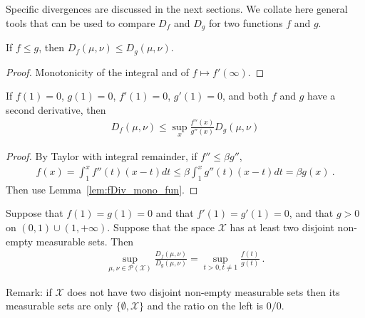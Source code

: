 Specific divergences are discussed in the next sections. We collate here general tools that can be used to compare $D_f$ and $D_g$ for two functions $f$ and $g$.

\begin{lemma}
  \label{lem:fDiv_mono_fun}
  If $f \le g$, then $D_f(\mu, \nu) \le D_g(\mu, \nu)$.
\end{lemma}

\begin{proof}
Monotonicity of the integral and of $f \mapsto f'(\infty)$.
\end{proof}


\begin{lemma}
  \label{lem:fDiv_le_of_deriv2_le}
  If $f(1) = 0$, $g(1) = 0$, $f'(1) = 0$, $g'(1) = 0$, and both $f$ and $g$ have a second derivative, then
  \begin{align*}
  D_f(\mu, \nu) \le \sup_x \frac{f''(x)}{g''(x)} D_g(\mu, \nu)
  \end{align*}
\end{lemma}

\begin{proof}%
{}
By Taylor with integral remainder, if $f'' \le \beta g''$,
\begin{align*}
f(x) = \int_1^x f''(t) (x - t) dt
\le \beta \int_1^x g''(t) (x - t) dt
= \beta g(x)
\: .
\end{align*}
Then use Lemma~\ref{lem:fDiv_mono_fun}.
\end{proof}


\begin{theorem}
  \label{thm:fDiv_eq_sup_mul_fDiv}
  Suppose that $f(1) = g(1) = 0$ and that $f'(1) = g'(1) = 0$, and that $g>0$ on $(0,1) \cup (1, +\infty)$. Suppose that the space $\mathcal X$ has at least two disjoint non-empty measurable sets. Then
  \begin{align*}
  \sup_{\mu, \nu \in \mathcal P(\mathcal X)} \frac{D_f(\mu, \nu)}{D_g(\mu, \nu)}
  = \sup_{t > 0, t \ne 1} \frac{f(t)}{g(t)}
  \: .
  \end{align*}
\end{theorem}

Remark: if $\mathcal X$ does not have two disjoint non-empty measurable sets then its measurable sets are only $\{\emptyset, \mathcal X\}$ and the ratio on the left is $0/0$.

